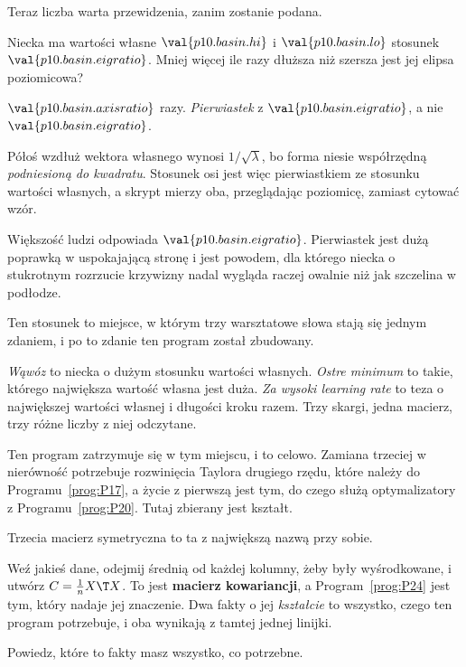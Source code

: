 \begin{fr}
Teraz liczba warta przewidzenia, zanim zostanie podana.

Niecka ma wartości własne $\val{p10.basin.hi}$ i $\val{p10.basin.lo}$ \dash{}
stosunek $\val{p10.basin.eigratio}$. Mniej więcej ile razy dłuższa niż szersza
jest jej elipsa poziomicowa?
\dotline
\nextframe
\end{fr}

\begin{fr}
\begin{ansblock}
$\val{p10.basin.axisratio}$ razy. \emph{Pierwiastek} z
$\val{p10.basin.eigratio}$, a nie $\val{p10.basin.eigratio}$.
\end{ansblock}

Półoś wzdłuż wektora własnego wynosi $1/\sqrt{\lambda}$, bo forma niesie
współrzędną \emph{podniesioną do kwadratu}. Stosunek osi jest więc pierwiastkiem
ze stosunku wartości własnych, a skrypt mierzy oba, przeglądając poziomicę,
zamiast cytować wzór.

Większość ludzi odpowiada $\val{p10.basin.eigratio}$. Pierwiastek jest dużą
poprawką w uspokajającą stronę i jest powodem, dla którego niecka o
stukrotnym rozrzucie krzywizny nadal wygląda raczej owalnie niż jak szczelina w
podłodze.
\end{fr}


\begin{fr}
Ten stosunek to miejsce, w którym trzy warsztatowe słowa stają się jednym
zdaniem, i po to zdanie ten program został zbudowany.

\emph{Wąwóz} to niecka o dużym stosunku wartości własnych. \emph{Ostre minimum}
to takie, którego największa wartość własna jest duża. \emph{Za wysoki
learning rate} to teza o największej wartości własnej i długości kroku razem.
Trzy skargi, jedna macierz, trzy różne liczby z niej odczytane.

Ten program zatrzymuje się w tym miejscu, i to celowo. Zamiana trzeciej w
nierówność potrzebuje rozwinięcia Taylora drugiego rzędu, które należy do
Programu~\ref{prog:P17}, a życie z pierwszą jest tym, do czego służą
optymalizatory z Programu~\ref{prog:P20}. Tutaj zbierany jest kształt.
\end{fr}

\begin{fr}
Trzecia macierz symetryczna to ta z największą nazwą przy sobie.

Weź jakieś dane, odejmij średnią od każdej kolumny, żeby były wyśrodkowane, i
utwórz $C = \frac{1}{n}X\T X$. To jest \textbf{macierz kowariancji}, a
Program~\ref{prog:P24} jest tym, który nadaje jej znaczenie. Dwa fakty o jej
\emph{kształcie} to wszystko, czego ten program potrzebuje, i oba wynikają z
tamtej jednej linijki.

Powiedz, które to fakty \dash{} masz wszystko, co potrzebne.
\dotline
\nextframe
\end{fr}

